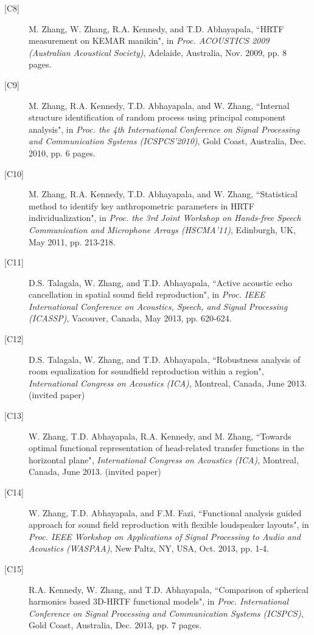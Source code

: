 \documentclass[10pt]{article}
\begin{document}
\begin{description}
\item[{[}C8{]}]M. Zhang, W. Zhang, R.A. Kennedy, and T.D. Abhayapala, ``HRTF measurement on KEMAR manikin",
in \emph{Proc. ACOUSTICS 2009 (Australian Acoustical Society)}, Adelaide, Australia, Nov. 2009, pp. 8 pages.

\item[{[}C9{]}]M. Zhang, R.A. Kennedy, T.D. Abhayapala, and W. Zhang, ``Internal structure identification of random process using principal component analysis", in \emph{Proc. the 4th International Conference on Signal Processing and Communication Systems (ICSPCS'2010)}, Gold Coast, Australia, Dec. 2010, pp. 6 pages.

\item[{[}C10{]}]M. Zhang, R.A. Kennedy, T.D. Abhayapala, and W. Zhang, ``Statistical method to identify key anthropometric parameters in HRTF individualization", in \emph{Proc. the 3rd Joint Workshop on Hands-free Speech Communication and Microphone Arrays (HSCMA'11)}, Edinburgh, UK,  May 2011, pp. 213-218.

\item[{[}C11{]}]D.S. Talagala, W. Zhang, and T.D. Abhayapala, ``Active acoustic echo cancellation in spatial sound field reproduction", in \emph{Proc. IEEE International Conference on Acoustics, Speech, and Signal Processing (ICASSP)}, Vacouver, Canada, May 2013, pp. 620-624.

\item[{[}C12{]}]D.S. Talagala, W. Zhang, and T.D. Abhayapala, ``Robustness analysis of room equalization for soundfield reproduction within a region", \emph{International Congress on Acoustics (ICA)}, Montreal, Canada, June 2013. (invited paper)

\item[{[}C13{]}]W. Zhang, T.D. Abhayapala, R.A. Kennedy, and M. Zhang, ``Towards optimal functional representation of head-related transfer functions in the horizontal plane", \emph{International Congress on Acoustics (ICA)}, Montreal, Canada, June 2013. (invited paper)

\item[{[}C14{]}]W. Zhang, T.D. Abhayapala, and F.M. Fazi, ``Functional analysis guided approach for sound field reproduction with flexible loudspeaker layouts", in {\em Proc. IEEE Workshop on Applications of Signal Processing to Audio and Acoustics (WASPAA)}, New Paltz, NY, USA, Oct. 2013, pp. 1-4.

\item[{[}C15{]}]R.A. Kennedy, W. Zhang, and T.D. Abhayapala, ``Comparison of spherical harmonics based 3D-HRTF functional models", in {\em Proc. International Conference on Signal Processing and Communication Systems (ICSPCS)}, Gold Coast, Australia, Dec. 2013, pp. 7 pages.


\end{description}
\end{document}
